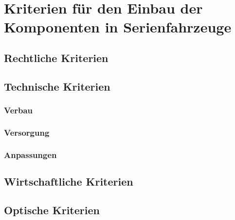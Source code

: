 \chapter{Kriterien für den Einbau der Komponenten in Serienfahrzeuge}
\label{cha:Kriterien}
\section{Rechtliche Kriterien}
\section{Technische Kriterien}
\subsection{Verbau}
\subsection{Versorgung}
\subsection{Anpassungen}
\section{Wirtschaftliche Kriterien}
\section{Optische Kriterien}